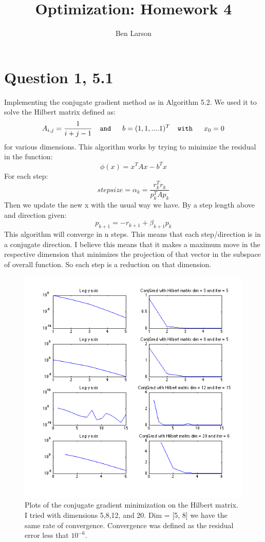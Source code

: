 \documentclass[7pt]{article}
\author{Ben Larson}
\title{Optimization: Homework 4}
\begin{document}
	\maketitle
	\section{Question 1, 5.1}
	Implementing the conjugate gradient method as in Algorithm 5.2. We used it to solve the Hilbert matrix defined as: 
	$$ A_{i,j} = \frac{1}{i+j-1}  \verb|  and   | b = (1,1,....1)^T  \verb |  with   | x_0=0$$ for various dimensions. This algorithm works by trying to minimize the residual in the function: 
	$$ \phi(x) = x^TAx - b^Tx $$
	For each step: 
	$$ stepsize = \alpha_k = \frac{r_k^Tr_k}{p_k^TAp_k} $$
	Then we update the new x with the usual way we have. By a step length above and direction given: 
	$$ p_{k+1} = -r_{k+1} + \beta_{k+1}p_k $$
	This algorithm will converge in n steps. This means that each step/direction is in a conjugate direction. I believe this means that it makes a maximum move in the respective dimension that minimizes the projection of that vector in the subspace of overall function. So each step is a reduction on that dimension.  
\begin{figure}[ht]
	\includegraphics[width=15cm]{untitled}
	\centering
	\caption{Plots of the conjugate gradient minimization on the Hilbert matrix. I tried with dimensions 5,8,12, and 20. Dim = [5, 8] we have the same rate of convergence. Convergence was defined as the residual error less that $10^{-6}$. }
\end{figure}
\end{document}

